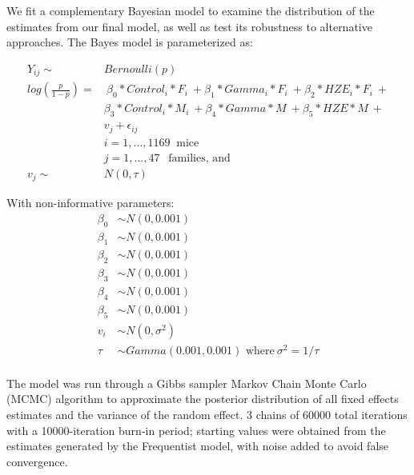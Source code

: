 \documentclass[
]{article}
\begin{document}
We fit a complementary Bayesian model to examine the distribution of the
estimates from our final model, as well as test its robustness to
alternative approaches. The Bayes model is parameterized as:

\[
\begin{aligned}
Y_{ij} \sim &Bernoulli(p)\\
log(\frac{p}{1-p}) = &\ \beta_0*Control_i*F_i\ +\beta_1*Gamma_i*F_i\ + \beta_2*HZE_i*F_i\ + \\ &\beta_3*Control_i*M_i\ +\beta_4*Gamma*M\ + \beta_5*HZE*M\ + \\
&v_{j} + \epsilon_{ij}\\
&i = 1, ..., 1169\ \mbox{ mice} \\
&j = 1,...,47\ \ \mbox{ families, and} \\
v_j \sim\ &N(0, \tau)
\end{aligned}
\]

With non-informative parameters:\\
\[
\begin{aligned}
\beta_0 &\sim N(0, 0.001)\\
\beta_1 &\sim N(0, 0.001)\\
\beta_2 &\sim N(0, 0.001)\\
\beta_3 &\sim N(0, 0.001)\\
\beta_4 &\sim N(0, 0.001)\\
\beta_5 &\sim N(0, 0.001)\\
v_i &\sim N(0, \sigma^2)\\
\tau &\sim Gamma(0.001, 0.001) \mbox{ where}\ \sigma^2 = 1/\tau\\
\end{aligned}
\]

The model was run through a Gibbs sampler Markov Chain Monte Carlo
(MCMC) algorithm to approximate the posterior distribution of all fixed
effects estimates and the variance of the random effect. 3 chains of
60000 total iterations with a 10000-iteration burn-in period; starting
values were obtained from the estimates generated by the Frequentist
model, with noise added to avoid false convergence.
\end{document}
